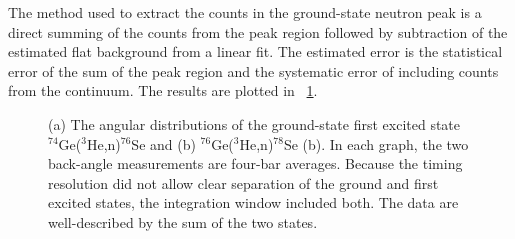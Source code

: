 The method used to extract the counts in the ground-state neutron peak is a direct summing of the counts from the peak region followed by subtraction of the estimated flat background from a linear fit.  The estimated error is the statistical error of the sum of the peak region and the systematic error of including counts from the continuum.  The results are plotted in {\fig}~\ref{fig:PS_angularDistribution}.
\begin{figure}[!htbp]
\centering
{}
\caption{(a) The angular distributions of the ground-state first excited state $^{74}$Ge($^3$He,n)$^{76}$Se and (b) $^{76}$Ge($^3$He,n)$^{78}$Se (b).  In each graph, the two back-angle measurements are four-bar averages.  Because the timing resolution did not allow clear separation of the ground and first excited states, the integration window included both.  The data are well-described by the sum of the two states.}
\label{fig:PS_angularDistribution}
\end{figure}


